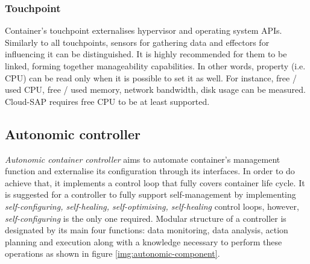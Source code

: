 \subsubsection{Touchpoint}
Container's touchpoint externalises hypervisor and operating system APIs. Similarly to all touchpoints, sensors for gathering data and effectors for influencing it can be distinguished. It is highly recommended for them to be linked, forming together manageability capabilities. In other words, property (i.e. CPU) can be read only when it is possible to set it as well. For instance, free / used CPU, free / used memory, network bandwidth, disk usage can be measured. Cloud-SAP requires free CPU to be at least supported.

\subsection{Autonomic controller}
\emph{Autonomic container controller} aims to automate container's management function and externalise its configuration through its interfaces. In order to do achieve that, it implements a control loop that fully covers container life cycle. It is suggested for a controller to fully support self-management by implementing \emph{self-configuring, self-healing, self-optimising, self-healing} control loops, however, \emph{self-configuring} is the only one required. Modular structure of a controller is designated by its main four functions: data monitoring, data analysis, action planning and execution along with a knowledge necessary to perform these operations as shown in figure \ref{img:autonomic-component}. 

